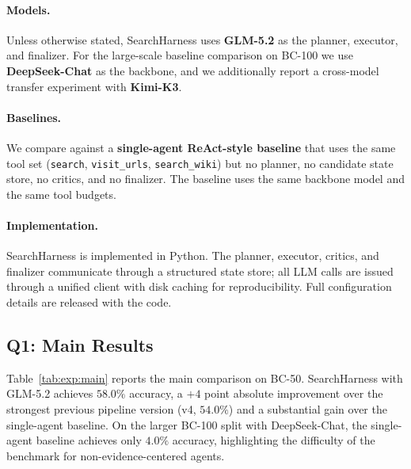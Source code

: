 \paragraph{Models.}
Unless otherwise stated, SearchHarness uses \textbf{GLM-5.2} as the planner, executor, and finalizer.
For the large-scale baseline comparison on BC-100 we use \textbf{DeepSeek-Chat} as the backbone, and we additionally report a cross-model transfer experiment with \textbf{Kimi-K3}.

\paragraph{Baselines.}
We compare against a \textbf{single-agent ReAct-style baseline} that uses the same tool set (\texttt{search}, \texttt{visit\_urls}, \texttt{search\_wiki}) but no planner, no candidate state store, no critics, and no finalizer.
The baseline uses the same backbone model and the same tool budgets.

\paragraph{Implementation.}
SearchHarness is implemented in Python.
The planner, executor, critics, and finalizer communicate through a structured state store; all LLM calls are issued through a unified client with disk caching for reproducibility.
Full configuration details are released with the code.

\subsection{Q1: Main Results}
\label{sec:exp:main}

Table~\ref{tab:exp:main} reports the main comparison on BC-50.
SearchHarness with GLM-5.2 achieves $58.0\%$ accuracy, a $+4$ point absolute improvement over the strongest previous pipeline version (v4, $54.0\%$) and a substantial gain over the single-agent baseline.
On the larger BC-100 split with DeepSeek-Chat, the single-agent baseline achieves only $4.0\%$ accuracy, highlighting the difficulty of the benchmark for non-evidence-centered agents.

